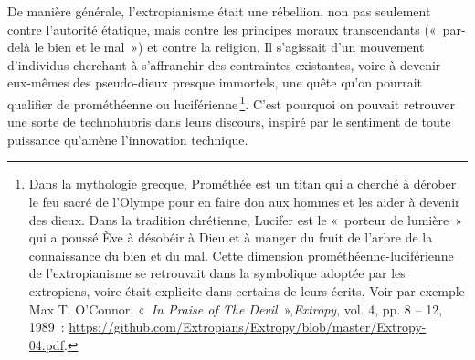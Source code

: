 \documentclass[a4paper,notitlepage]{article}
\newcommand{\eng}[1]{{\NoAutoSpaceBeforeFDP\emph{#1}}}  %
\newcommand{\wtime}[1]{{\NoAutoSpaceBeforeFDP#1}}       %
\newcommand{\sfootnote}{\,\footnote}
\begin{document}
De manière générale, l'extropianisme était une rébellion, non pas seulement contre l'autorité étatique, mais contre les principes moraux transcendants («~par-delà le bien et le mal~») et contre la religion. Il s'agissait d'un mouvement d'individus cherchant à s'affranchir des contraintes existantes, voire à devenir eux-mêmes des pseudo-dieux presque immortels, une quête qu'on pourrait qualifier de prométhéenne ou luciférienne\sfootnote{Dans la mythologie grecque, Prométhée est un titan qui a cherché à dérober le feu sacré de l'Olympe pour en faire don aux hommes et les aider à devenir des dieux. Dans la tradition chrétienne, Lucifer est le «~porteur de lumière~» qui a poussé Ève à désobéir à Dieu et à manger du fruit de l'arbre de la connaissance du bien et du mal.  Cette dimension prométhéenne-luciférienne de l'extropianisme se retrouvait dans la symbolique adoptée par les extropiens, voire était explicite dans certains de leurs écrits. Voir par exemple Max T. O'Connor, «~\eng{In Praise of The Devil}~»,\eng{Extropy}, vol. 4, pp. 8 -- 12, 1989~: \url{https://github.com/Extropians/Extropy/blob/master/Extropy-04.pdf}.}. C'est pourquoi on pouvait retrouver une sorte de technohubris dans leurs discours, inspiré par le sentiment de toute puissance qu'amène l'innovation technique. %
\end{document}

